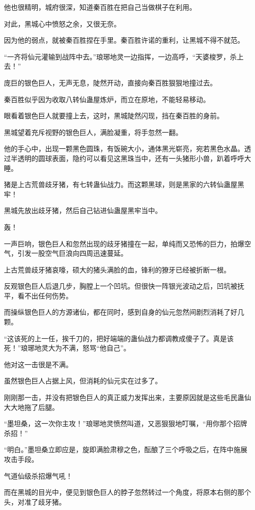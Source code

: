 \begin{this_body}
他也很精明，城府很深，知道秦百胜在把自己当做棋子在利用。

对此，黑城心中愤怒之余，又很无奈。

因为他的弱点，就被秦百胜捏在手里。秦百胜许诺的重利，让黑城不得不就范。

“一齐将仙元灌输到战阵中去。”琅琊地灵一边指挥，一边高呼，“天婆梭罗，杀上去！”

庞巨的银色巨人，无声无息，陡然开动，直接向秦百胜狠狠地撞过去。

秦百胜似乎因为收取八转仙蛊屋炼炉，而立在原地，不能轻易移动。

眼看着银色巨人就要撞上去，这时，黑城陡然闪现，挡在秦百胜的身前。

黑城望着充斥视野的银色巨人，满脸凝重，将手忽然一翻。

他的手心中，出现一颗黑色圆珠，有饭碗大小，通体黑光崭亮，宛若黑色水晶。透过半透明的圆球表面，隐约可以看见这黑珠当中，还有一头猪形小兽，趴着呼呼大睡。

猪是上古荒兽歧牙猪，有七转蛊仙战力。而这颗黑球，则是黑家的六转仙蛊屋黑牢！

黑城先放出歧牙猪，然后自己钻进仙蛊屋黑牢当中。

轰！

一声巨响，银色巨人和忽然出现的歧牙猪撞在一起，单纯而又恐怖的巨力，拍爆空气，引发一股空气巨浪向四周迅速蔓延。

上古荒兽歧牙猪哀嚎，硕大的猪头满脸的血，锋利的獠牙已经被折断一根。

反观银色巨人后退几步，胸膛上一个凹坑。但很快一阵银光波动之后，凹坑被抚平，看不出任何伤势。

而操纵银色巨人的方源诸仙，都在同时，感到自身的仙元忽然间剧烈消耗了好几颗。

“这该死的上一任，挨千刀的，把好端端的蛊仙战力都调教成傻子了。真是该死！”琅琊地灵大为不满，怒骂“他自己”。

他对这一击很是不满。

虽然银色巨人占据上风，但消耗的仙元实在过多了。

刚刚那一击，并没有把银色巨人的真正威力发挥出来，主要原因就是这些毛民蛊仙大大地拖了后腿。

“墨坦桑，这一次你主攻！”琅琊地灵愤然叫道，又恶狠狠地叮嘱，“用你那个招牌杀招！”

“明白。”墨坦桑立即应是，旋即满脸肃穆之色，酝酿了三个呼吸之后，在阵中施展攻击手段。

气道仙级杀招爆气吼！

而在黑城的目光中，便见到银色巨人的脖子忽然转过一个角度，将原本右侧的那个头，对准了歧牙猪。


\end{this_body}

